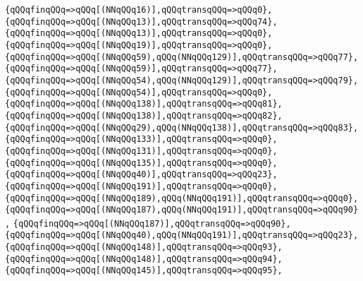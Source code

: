 \verb|{qQQqfinqQQq=>qQQq[(NNqQQq16)],qQQqtransqQQq=>qQQq0},|\newline
\verb|{qQQqfinqQQq=>qQQq[(NNqQQq13)],qQQqtransqQQq=>qQQq74},|\newline
\verb|{qQQqfinqQQq=>qQQq[(NNqQQq13)],qQQqtransqQQq=>qQQq0},|\newline
\verb|{qQQqfinqQQq=>qQQq[(NNqQQq19)],qQQqtransqQQq=>qQQq0},|\newline
\verb|{qQQqfinqQQq=>qQQq[(NNqQQq59),qQQq(NNqQQq129)],qQQqtransqQQq=>qQQq77},|\newline
\verb|{qQQqfinqQQq=>qQQq[(NNqQQq59)],qQQqtransqQQq=>qQQq77},|\newline
\verb|{qQQqfinqQQq=>qQQq[(NNqQQq54),qQQq(NNqQQq129)],qQQqtransqQQq=>qQQq79},|\newline
\verb|{qQQqfinqQQq=>qQQq[(NNqQQq54)],qQQqtransqQQq=>qQQq0},|\newline
\verb|{qQQqfinqQQq=>qQQq[(NNqQQq138)],qQQqtransqQQq=>qQQq81},|\newline
\verb|{qQQqfinqQQq=>qQQq[(NNqQQq138)],qQQqtransqQQq=>qQQq82},|\newline
\verb|{qQQqfinqQQq=>qQQq[(NNqQQq29),qQQq(NNqQQq138)],qQQqtransqQQq=>qQQq83},|\newline
\verb|{qQQqfinqQQq=>qQQq[(NNqQQq133)],qQQqtransqQQq=>qQQq0},|\newline
\verb|{qQQqfinqQQq=>qQQq[(NNqQQq131)],qQQqtransqQQq=>qQQq0},|\newline
\verb|{qQQqfinqQQq=>qQQq[(NNqQQq135)],qQQqtransqQQq=>qQQq0},|\newline
\verb|{qQQqfinqQQq=>qQQq[(NNqQQq40)],qQQqtransqQQq=>qQQq23},|\newline
\verb|{qQQqfinqQQq=>qQQq[(NNqQQq191)],qQQqtransqQQq=>qQQq0},|\newline
\verb|{qQQqfinqQQq=>qQQq[(NNqQQq189),qQQq(NNqQQq191)],qQQqtransqQQq=>qQQq0},|\newline
\verb|{qQQqfinqQQq=>qQQq[(NNqQQq187),qQQq(NNqQQq191)],qQQqtransqQQq=>qQQq90},|\newline
\verb|{qQQqfinqQQq=>qQQq[(NNqQQq187)],qQQqtransqQQq=>qQQq90},|\newline
\verb|{qQQqfinqQQq=>qQQq[(NNqQQq40),qQQq(NNqQQq191)],qQQqtransqQQq=>qQQq23},|\newline
\verb|{qQQqfinqQQq=>qQQq[(NNqQQq148)],qQQqtransqQQq=>qQQq93},|\newline
\verb|{qQQqfinqQQq=>qQQq[(NNqQQq148)],qQQqtransqQQq=>qQQq94},|\newline
\verb|{qQQqfinqQQq=>qQQq[(NNqQQq145)],qQQqtransqQQq=>qQQq95},|\newline
